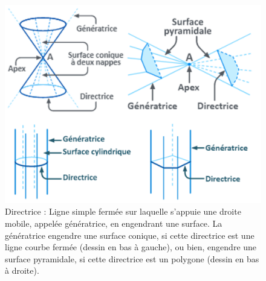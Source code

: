 \documentclass[12pt]{article}
\begin{document}
\begin{figure}
\centering
\includegraphics[width=0.9\linewidth]{Images/directrice.png}
\caption{Directrice : Ligne simple fermée sur laquelle s’appuie une droite mobile, appelée génératrice, en engendrant une surface. La génératrice engendre une surface conique, si cette directrice est une ligne courbe fermée (dessin en bas à gauche), ou bien, engendre une surface pyramidale, si cette directrice est un polygone (dessin en bas à droite).}
\label{directrice}
\end{figure}
\end{document}
